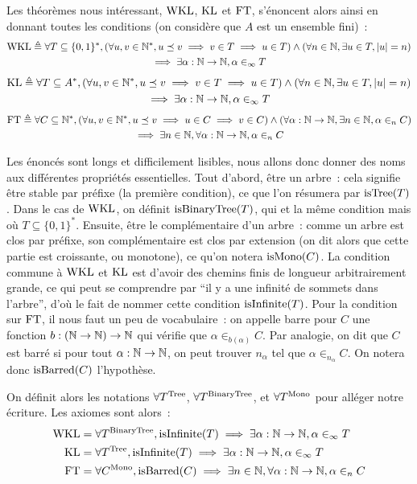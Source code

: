 \documentclass{article}
\begin{document}
Les théorèmes nous intéressant, $\mathrm{WKL}$, $\mathrm{KL}$ et $\mathrm{FT}$, s'énoncent alors ainsi en donnant toutes les conditions (on considère que $A$ est un ensemble fini)~:
\begin{multline*}
    \mathrm{WKL} \triangleq \forall T \subseteq\{0,1\}^*, (\forall u,v\in \mathbb{N}^*, u\preceq v \implies v \in T \implies u \in T)\land (\forall n \in \mathbb{N}, \exists u \in T, |u| = n)\\ \implies \exists \alpha : \mathbb{N}\to\mathbb{N}, \alpha \in_\infty T
\end{multline*}
\begin{multline*}
    \mathrm{KL} \triangleq \forall T \subseteq A^*, (\forall u,v\in \mathbb{N}^*, u\preceq v \implies v \in T \implies u \in T)\land (\forall n \in \mathbb{N}, \exists u \in T, |u| = n) \\ \implies \exists \alpha : \mathbb{N}\to\mathbb{N}, \alpha \in_\infty T
\end{multline*}
\begin{multline*}
    \mathrm{FT} \triangleq \forall C \subseteq \mathbb{N}^*, (\forall u,v\in \mathbb{N}^*, u\preceq v \implies u \in C \implies v \in C) \land (\forall \alpha : \mathbb{N}\to\mathbb{N}, \exists n \in \mathbb{N}, \alpha \in_n C) \\\implies \exists n \in \mathbb{N}, \forall \alpha : \mathbb{N}\to\mathbb{N}, \alpha \in_n C
\end{multline*}

Les énoncés sont longs et difficilement lisibles, nous allons donc donner des noms aux différentes propriétés essentielles. Tout d'abord, être un arbre~: cela signifie être stable par préfixe (la première condition), ce que l'on résumera par $\mathrm{isTree}(T)$. Dans le cas de $\mathrm{WKL}$, on définit $\mathrm{isBinaryTree}(T)$, qui et la même condition mais où $T\subseteq\{0,1\}^*$. Ensuite, être le complémentaire d'un arbre~: comme un arbre est clos par préfixe, son complémentaire est clos par extension (on dit alors que cette partie est croissante, ou monotone), ce qu'on notera $\mathrm{isMono}(C)$. La condition commune à $\mathrm{WKL}$ et $\mathrm{KL}$ est d'avoir des chemins finis de longueur arbitrairement grande, ce qui peut se comprendre par ``il y a une infinité de sommets dans l'arbre'', d'où le fait de nommer cette condition $\mathrm{isInfinite}(T)$. Pour la condition sur $\mathrm{FT}$, il nous faut un peu de vocabulaire~: on appelle barre pour $C$ une fonction $b : (\mathbb{N} \to \mathbb{N}) \to \mathbb{N}$ qui vérifie que $\alpha \in_{b(\alpha)} C$. Par analogie, on dit que $C$ est barré si pour tout $\alpha : \mathbb{N} \to \mathbb{N}$, on peut trouver $n_\alpha$ tel que $\alpha \in_{n_\alpha} C$. On notera donc $\mathrm{isBarred}(C)$ l'hypothèse.

On définit alors les notations $\forall T^{\mathrm{Tree}}$, $\forall T^{\mathrm{BinaryTree}}$, et $\forall T^{\mathrm{Mono}}$ pour alléger notre écriture. Les axiomes sont alors~:
\begin{align*}
    \mathrm{WKL} &= \forall T^{\mathrm{BinaryTree}}, \mathrm{isInfinite}(T) \implies \exists \alpha : \mathbb{N} \to \mathbb{N}, \alpha\in_\infty T\\
    \mathrm{KL} &= \forall T^{\mathrm{Tree}},\mathrm{isInfinite}(T) \implies \exists \alpha : \mathbb{N}\to\mathbb{N}, \alpha \in_\infty T\\
    \mathrm{FT} &= \forall C^{\mathrm{Mono}},\mathrm{isBarred}(C) \implies \exists n \in \mathbb{N}, \forall \alpha : \mathbb{N} \to \mathbb{N}, \alpha \in_n C
\end{align*}
\end{document}
